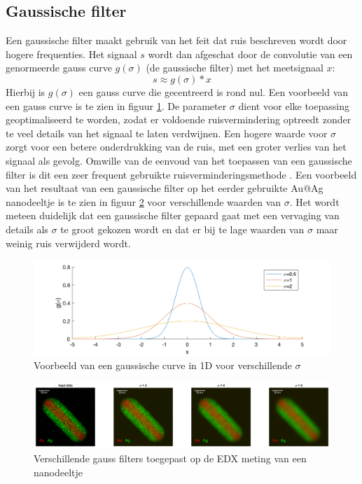 \documentclass{report}
\begin{document}
\subsection{Gaussische filter}
Een gaussische filter maakt gebruik van het feit dat ruis beschreven wordt door hogere frequenties. Het signaal $s$ wordt dan afgeschat door de convolutie van een genormeerde gauss curve $g(\sigma)$ (de gaussische filter) met het meetsignaal $x$:
\[ s \approx g(\sigma) * x \]
Hierbij is $g(\sigma)$ een gauss curve die gecentreerd is rond nul. Een voorbeeld van een gauss curve is te zien in figuur \ref{fig:tem_gauss}. De parameter $\sigma$ dient voor elke toepassing geoptimaliseerd te worden, zodat er voldoende ruisvermindering optreedt zonder te veel details van het signaal te laten verdwijnen. Een hogere waarde voor $\sigma$ zorgt voor een betere onderdrukking van de ruis, met een groter verlies van het signaal als gevolg. Omwille van de eenvoud van het toepassen van een gaussische filter is dit een zeer frequent gebruikte ruisverminderingsmethode \cite{paper:gauss}. Een voorbeeld van het resultaat van een gaussische filter op het eerder gebruikte Au@Ag nanodeeltje is te zien in figuur \ref{fig:tem_gauss_sigma} voor verschillende waarden van $\sigma$. Het wordt meteen duidelijk dat een gaussische filter gepaard gaat met een vervaging van details als $\sigma$ te groot gekozen wordt en dat er bij te lage waarden van $\sigma$ maar weinig ruis verwijderd wordt.
\begin{figure}[h!]
	\centering
	\includegraphics[width=15cm]{images/tem/gauss.png}
	\caption{Voorbeeld van een gaussische curve in 1D voor verschillende $\sigma$}
	\label{fig:tem_gauss}
\end{figure}
\begin{figure}[h!]
	\centering
	\includegraphics[width=15cm]{images/tem/gauss_sigma.png}
	\caption{Verschillende gauss filters toegepast op de EDX meting van een nanodeeltje}
	\label{fig:tem_gauss_sigma}
\end{figure}
\end{document}
